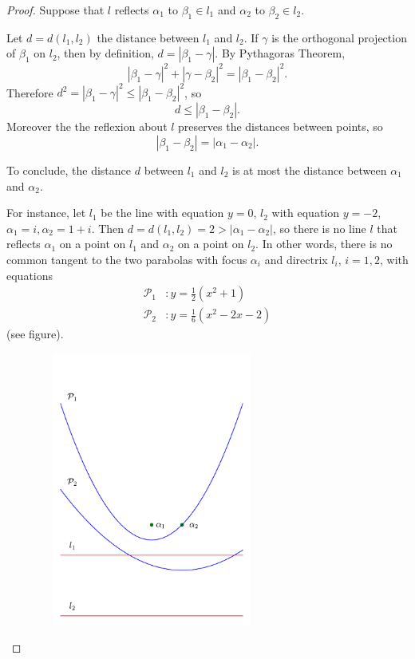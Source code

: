 \documentclass[11pt,a4paper]{article}
\begin{document}
\begin{proof}
Suppose that $l$ reflects $\alpha_1$ to $\beta_1 \in l_1$ and $\alpha_2$ to $\beta_2 \in l_2$.

Let $d =d(l_1,l_2)$ the distance between $l_1$ and $l_2$. If $\gamma$ is the orthogonal projection of $\beta_1$ on $l_2$, then by definition, $d = |\beta_1 - \gamma|$. By Pythagoras Theorem,
$$|\beta_1 - \gamma|^2 + |\gamma - \beta_2|^2 = |\beta_1 - \beta_2|^2.$$
Therefore $d^2 = |\beta_1 - \gamma|^2 \leq |\beta_1 - \beta_2|^2$, so $$d \leq |\beta_1 - \beta_2|.$$
Moreover the the reflexion about $l$ preserves the distances between points, so
$$|\beta_1 - \beta_2| = |\alpha_1 - \alpha_2|.$$

To conclude, the distance $d$ between $l_1$ and $l_2$ is at most the distance between $\alpha_1$ and $\alpha_2$.

For instance, let $l_1$ be the line with equation $y=0$, $l_2$ with equation $y=-2$, $\alpha_1 = i, \alpha_2 = 1+i$. Then $d = d(l_1,l_2) = 2 > |\alpha_1 - \alpha_2 |$, so there is no line $l$ that reflects $\alpha_1$ on a point on $l_1$ and $\alpha_2$ on a point on $l_2$. In other words, there is no common tangent to the two parabolas with focus $\alpha_i$ and directrix $l_i$, $i=1,2$, with equations
\begin{align*}
{\mathscr P} _1 &: y = \frac{1}{2} (x^2+1)\\
{\mathscr P} _2 &: y = \frac{1}{6} (x^2 - 2x-2)
\end{align*}
(see figure).
\begin{figure}[htbp]
\begin{center}
\includegraphics[width=7.5cm, height=9cm]  {parabolas.pdf}
\end{center}
\end{figure}
\end{proof}
\end{document}
